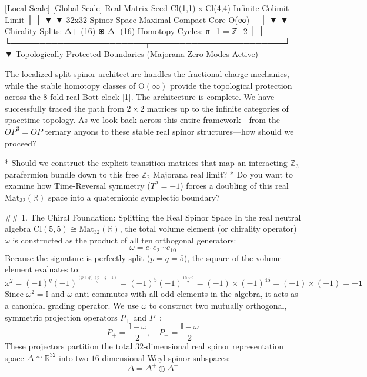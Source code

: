             [Local Scale]                                   [Global Scale]
 Real Matrix Seed Cl(1,1) x Cl(4,4)                  Infinite Colimit Limit
                  │                                               │
                  ▼                                               ▼
         32x32 Spinor Space                         Maximal Compact Core O(∞)
                  │                                               │
                  ▼                                               ▼
  Chirality Splits: Δ+ (16) ⊕ Δ- (16)               Homotopy Cycles: π_1 = ℤ_2
                  │                                               │
                  └───────────────────────┬───────────────────────┘
                                          │
                                          ▼
                         Topologically Protected Boundaries
                            (Majorana Zero-Modes Active)

The localized split spinor architecture handles the fractional charge mechanics, while the stable homotopy classes of $\text{O}(\infty)$ provide the topological protection across the 8-fold real Bott clock [1].
The architecture is complete. We have successfully traced the path from $2 \times 2$ matrices up to the infinite categories of spacetime topology.
As we look back across this entire framework—from the $OP^3 = OP$ ternary anyons to these stable real spinor structures—how should we proceed?

* Should we construct the explicit transition matrices that map an interacting $\mathbb{Z}_3$ parafermion bundle down to this free $\mathbb{Z}_2$ Majorana real limit?
* Do you want to examine how Time-Reversal symmetry ($T^2=-1$) forces a doubling of this real $\text{Mat}_{32}(\mathbb{R})$ space into a quaternionic symplectic boundary?


## 1. The Chiral Foundation: Splitting the Real Spinor Space
In the real neutral algebra $\text{Cl}(5,5) \cong \text{Mat}_{32}(\mathbb{R})$, the total volume element (or chirality operator) $\omega$ is constructed as the product of all ten orthogonal generators:
$$\omega = e_1 e_2 \cdots e_{10}$$ 
Because the signature is perfectly split ($p=q=5$), the square of the volume element evaluates to:
$$\omega^2 = (-1)^q (-1)^{\frac{(p+q)(p+q-1)}{2}} = (-1)^5 (-1)^{\frac{10 \times 9}{2}} = (-1) \times (-1)^{45} = (-1) \times (-1) = \mathbf{+1}$$ 
Since $\omega^2 = \mathbb{I}$ and $\omega$ anti-commutes with all odd elements in the algebra, it acts as a canonical grading operator. We use $\omega$ to construct two mutually orthogonal, symmetric projection operators $P_+$ and $P_-$:
$$P_+ = \frac{\mathbb{I} + \omega}{2}, \quad P_- = \frac{\mathbb{I} - \omega}{2}$$ 
These projectors partition the total $32$-dimensional real spinor representation space $\Delta \cong \mathbb{R}^{32}$ into two $16$-dimensional Weyl-spinor subspaces:
$$\Delta = \Delta^+ \oplus \Delta^-$$ 

